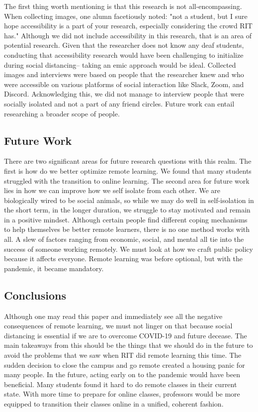 \documentclass[12pt,
 reprint,
nofootinbib,
 amsmath,amssymb,
 aps,
floatfix,
]{revtex4-2}
\begin{document}
The first thing worth mentioning is that this research is not all-encompassing. When collecting images, one alumn facetiously noted: "not a student, but I sure hope accessibility is a part of your research, especially considering the crowd RIT has." Although we did not include accessibility in this research, that is an area of potential research. Given that the researcher does not know any deaf students, conducting that accessibility research would have been challenging to initialize during social distancing-- taking an emic approach would be ideal.
Collected images and interviews were based on people that the researcher knew and who were accessible on various platforms of social interaction like Slack, Zoom, and Discord. Acknowledging this, we did not manage to interview people that were socially isolated and not a part of any friend circles. Future work can entail researching a broader scope of people. 



\subsection{Future Work}


There are two significant areas for future research questions with this realm. The first is how do we better optimize remote learning. We found that many students struggled with the transition to online learning. The second area for future work lies in how we can improve how we self isolate from each other. We are biologically wired to be social animals, so while we may do well in self-isolation in the short term, in the longer duration, we struggle to stay motivated and remain in a positive mindset. Although certain people find different coping mechanisms to help themselves be better remote learners, there is no one method works with all. A slew of factors ranging from economic, social, and mental all tie into the success of someone working remotely. We must look at how we craft public policy because it affects everyone. Remote learning was before optional, but with the pandemic, it became mandatory.


\subsection{Conclusions}

Although one may read this paper and immediately see all the negative consequences of remote learning, we must not linger on that because social distancing is essential if we are to overcome COVID-19 and future decease. The main takeaways from this should be the things that we should do in the future to avoid the problems that we saw when RIT did remote learning this time. The sudden decision to close the campus and go remote created a housing panic for many people. In the future, acting early on to the pandemic would have been beneficial. Many students found it hard to do remote classes in their current state. With more time to prepare for online classes, professors would be more equipped to transition their classes online in a unified, coherent fashion.
\end{document}

